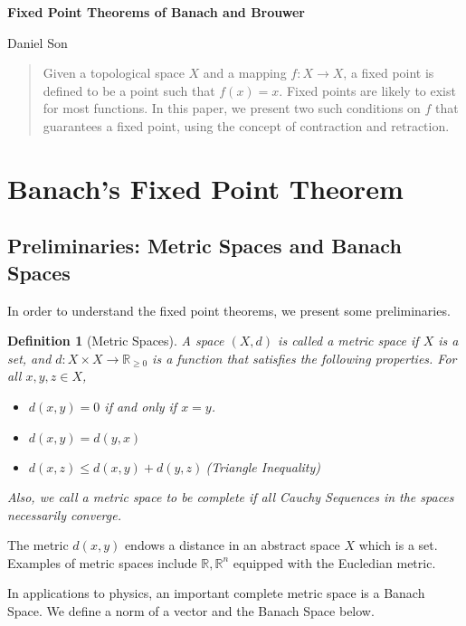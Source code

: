 \documentclass[10pt]{article}
\numberwithin{equation}{section}
\newtheorem{definition}{Definition}
\numberwithin{theorem}{section}
\numberwithin{proposition}{section}
\numberwithin{lemma}{section}
\numberwithin{corollary}{section}
\numberwithin{remark}{section}
\numberwithin{definition}{section}
\numberwithin{example}{section}
\numberwithin{conjecture}{section}
\numberwithin{question}{section}
\begin{document}
\begin{center}
    \Large
    \textbf{Fixed Point Theorems of Banach and Brouwer}

    \large
    Daniel Son
\end{center}

\begin{abstract}
    Given a topological space $X$ and a mapping $f:X\rightarrow X$, 
    a fixed point is defined to be a point such that $f(x) = x$. 
    Fixed points are likely to exist for most functions. In this paper, 
    we present two such conditions on $f$ that guarantees a fixed point, 
    using the concept of contraction and retraction. 
\end{abstract}

\section{Banach's Fixed Point Theorem}
\subsection{Preliminaries: Metric Spaces and Banach Spaces}
In order to understand the fixed point theorems, we present 
some preliminaries. 

\begin{definition}[Metric Spaces]
    A space $(X, d)$ is called a metric space if $X$ is a set, 
    and $d:X\times X \rightarrow \mathbb R_{\geq 0}$ is a function that satisfies 
    the following properties. For all $x, y, z \in X$,  
    \begin{itemize}
        \item $d(x, y) = 0$ if and only if $x = y$. 
        \item $d(x, y) = d(y, x)$
        \item $d(x, z) \leq d(x, y) + d(y, z) \ $\rm {(Triangle Inequality)}
    \end{itemize}
    Also, we call a metric space to be complete if all 
    Cauchy Sequences in the spaces necessarily converge. 
\end{definition}

The metric $d(x, y)$ endows a distance in an abstract space $X$ which 
is a set. Examples of metric spaces include $\mathbb{R}, \mathbb{R}^n$ 
equipped with the Eucledian metric. 

In applications to physics, an important complete metric space is a Banach 
Space. We define a norm of a vector and the Banach Space below. 
\end{document}
